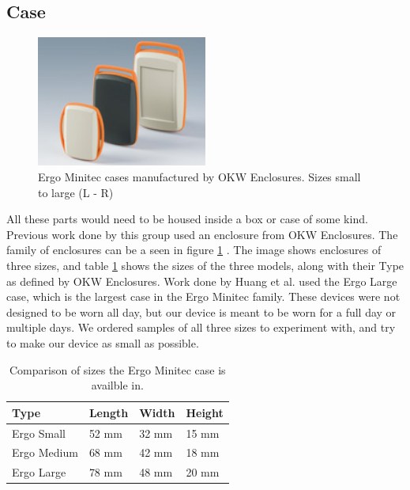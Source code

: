 \subsection{Case}
\label{Sec:Case}
\begin{figure}
\begin{center}
\includegraphics[width=0.5\textwidth]{images/OKWEN.jpg}
\caption{Ergo Minitec cases manufactured by OKW Enclosures. Sizes small to large (L - R)}
\label{Fig:OKWFam}
\end{center}
\end{figure}
All these parts would need to be housed inside a box or case of some kind.
Previous work done by this group used an enclosure from OKW Enclosures.
The family of enclosures can be a seen in figure \ref{Fig:OKWFam} \cite{Web:OKWPics}.
The image shows enclosures of three sizes,
and table \ref{Tab:OKWSize} shows the sizes of the three models,
along with their Type as defined by OKW Enclosures.
Work done by Huang et al. \cite{huang2013assessment} used the Ergo Large case,
which is the largest case in the Ergo Minitec family.
These devices were not designed to be worn all day,
but our device is meant to be worn for a full day or multiple days.
We ordered samples of all three sizes to experiment with,
and try to make our device as small as possible.
\begin{table}[h]
\centering
\begin{tabular}{@{}llll@{}}
\toprule
Type & Length & Width & Height \\ \midrule
Ergo Small   & 52 mm  & 32 mm & 15 mm  \\
Ergo Medium   & 68 mm  & 42 mm & 18 mm  \\
Ergo Large   & 78 mm  & 48 mm & 20 mm  \\ \bottomrule
\end{tabular}
\caption{Comparison of sizes the Ergo Minitec case is availble in.}
\label{Tab:OKWSize}
\end{table}

